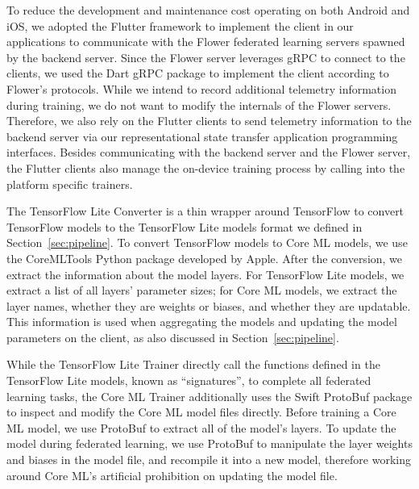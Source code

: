 To reduce the development and maintenance cost operating on both Android and
iOS,
we adopted the Flutter framework to implement the client in our applications to
communicate with the Flower federated learning servers spawned by the backend
server. Since the Flower server leverages gRPC to connect to the clients,
we used the Dart gRPC package to implement the client according to Flower's
protocols.
While we intend to record additional telemetry information during training,
we do not want to modify the internals of the Flower servers. Therefore,
we also rely on the Flutter clients to send telemetry information to the backend
server via our representational state transfer application programming
interfaces.
Besides communicating with the backend server and the Flower server,
the Flutter clients also manage the on-device training process by calling into
the platform specific trainers. %

The TensorFlow Lite Converter is a thin wrapper around TensorFlow to convert
TensorFlow models to the TensorFlow Lite models format we defined in
Section~\ref{sec:pipeline}.
To convert TensorFlow models to Core ML models,
we use the CoreMLTools Python package developed by Apple. After the conversion,
we extract the information about the model layers. For TensorFlow Lite models,
we extract a list of all layers' parameter sizes; for Core ML models,
we extract the layer names, whether they are weights or biases,
and whether they are updatable.
This information is used when aggregating the models and updating the model
parameters on the client, as also discussed in Section~\ref{sec:pipeline}.

While the TensorFlow Lite Trainer directly call the functions defined in the
TensorFlow Lite models, known as ``signatures'',
to complete all federated learning tasks,
the Core ML Trainer additionally uses the Swift ProtoBuf package to inspect and
modify the Core ML model files directly.
Before training a Core ML model,
we use ProtoBuf to extract all of the model's layers.
To update the model during federated learning,
we use ProtoBuf to manipulate the layer weights and biases in the model file,
and recompile it into a new model,
therefore working around Core ML's artificial prohibition on updating the model
file.
